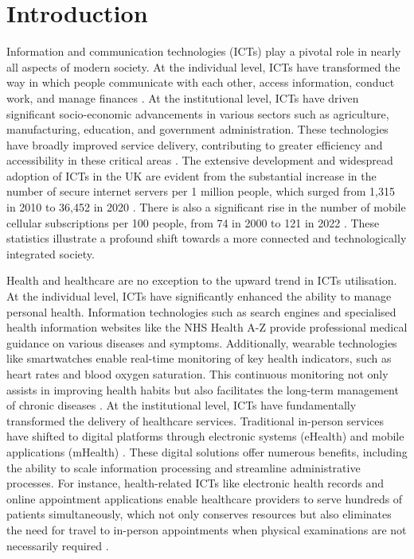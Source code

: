 \chapter{\label{ch:1-intro}Introduction} 

Information and communication technologies (ICTs) play a pivotal role in nearly all aspects of modern society. At the individual level, ICTs have transformed the way in which people communicate with each other, access information, conduct work, and manage finances \parencite{roztocki_role_2019}. At the institutional level, ICTs have driven significant socio-economic advancements in various sectors such as agriculture, manufacturing, education, and government administration. These technologies have broadly improved service delivery, contributing to greater efficiency and accessibility in these critical areas \parencite{roztocki_conceptualizing_2016}. The extensive development and widespread adoption of ICTs in the UK are evident from the substantial increase in the number of secure internet servers per 1 million people, which surged from 1,315 in 2010 to 36,452 in 2020 \parencite{worldbank_secure_2024}. There is also a significant rise in the number of mobile cellular subscriptions per 100 people, from 74 in 2000 to 121 in 2022 \parencite{worldbank_mobile_2024}. These statistics illustrate a profound shift towards a more connected and technologically integrated society.

Health and healthcare are no exception to the upward trend in ICTs utilisation. At the individual level, ICTs have significantly enhanced the ability to manage personal health. Information technologies such as search engines and specialised health information websites like the NHS Health A-Z \parencite{nhs_health_2024} provide professional medical guidance on various diseases and symptoms. Additionally, wearable technologies like smartwatches enable real-time monitoring of key health indicators, such as heart rates and blood oxygen saturation. This continuous monitoring not only assists in improving health habits but also facilitates the long-term management of chronic diseases \parencite{wu_wearable_2019}. At the institutional level, ICTs have fundamentally transformed the delivery of healthcare services. Traditional in-person services have shifted to digital platforms through electronic systems (eHealth) and mobile applications (mHealth) \parencite{makri_bridging_2019}. These digital solutions offer numerous benefits, including the ability to scale information processing and streamline administrative processes. For instance, health-related ICTs like electronic health records and online appointment applications enable healthcare providers to serve hundreds of patients simultaneously, which not only conserves resources but also eliminates the need for travel to in-person appointments when physical examinations are not necessarily required \parencite{alkureishi_digitally_2021}.


